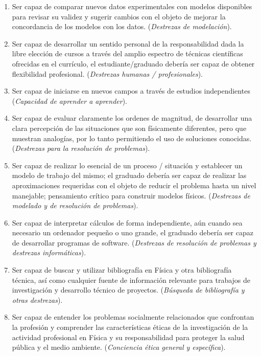 \begin{enumerate}
\item Ser capaz de comparar nuevos datos experimentales con modelos disponibles para revisar su validez y sugerir cambios con el objeto de mejorar la concordancia de los modelos con los datos. (\emph{Destrezas de modelación}).

\item Ser capaz de desarrollar un sentido personal de la responsabilidad dada la libre elección de cursos a través del amplio espectro de técnicas científicas ofrecidas en el currículo, el estudiante/graduado debería ser capaz de obtener flexibilidad profesional. (\emph{Destrezas humanas / profesionales}).

\item Ser capaz de iniciarse en nuevos campos a través de estudios independientes (\emph{Capacidad de aprender a aprender}).

\item Ser capaz de evaluar claramente los ordenes de magnitud, de desarrollar una clara percepción de las situaciones que son físicamente diferentes, pero que muestran analogías, por lo tanto permitiendo el uso de soluciones conocidas. (\emph{Destrezas para la resolución de problemas}).

\item Ser capaz de realizar lo esencial de un proceso / situación y establecer un modelo de trabajo del mismo; el graduado debería ser capaz de realizar las aproximaciones requeridas con el objeto de reducir el problema hasta un nivel manejable; pensamiento crítico para construir modelos físicos.
(\emph{Destrezas de modelado y de resolución de problemas}).

\item Ser capaz de interpretar cálculos de forma independiente, aún cuando sea necesario un ordenador pequeño o uno grande, el graduado debería ser capaz de desarrollar programas de software. (\emph{Destrezas de resolución de problemas y destrezas informáticas}).

\item Ser capaz de buscar y utilizar bibliografía en Física y otra bibliografía técnica, así como cualquier fuente de información relevante para trabajos de investigación y desarrollo técnico de proyectos. (\emph{Búsqueda de bibliografía y otras destrezas}).

\item Ser capaz de entender los problemas socialmente relacionados que confrontan la profesión y comprender las características éticas de la investigación de la actividad profesional en Física y su responsabilidad para proteger la salud pública y el medio ambiente. (\emph{Conciencia ética general y específica}).


\end{enumerate}
